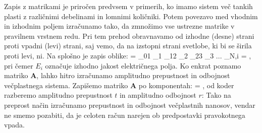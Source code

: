Zapis z matrikami je priročen predvsem v primerih, ko imamo sistem več tankih plasti
z različnimi debelinami in lomnimi količniki. Potem povezavo med vhodnim in izhodnim poljem
izračunamo tako, da zmnožimo vse ustrezne matrike v pravilnem vrstnem redu. Pri tem 
prehod obravnavamo od izhodne (desne) strani proti vpadni (levi) strani, saj vemo, da na
izstopni strani svetlobe, ki bi se širila proti levi, ni. Na splošno je zapis oblike:
\beq
\left[\begin{array}{c}
E_{0}\\
E_{0}'\\
\end{array}\right] = 
_{01}
_1
_{12}
_2
_{23}
_3 ... _{N,i}
\left[\begin{array}{c}
E_i\\
0\\
\end{array}\right] =
\left[\begin{array}{c}
E_i\\
0\\
\end{array}\right]\!\!,
\label{eq:06_63}
\eeq
pri čemer $E_i$ označuje izhodno jakost električnega polja. Ko enkrat 
poznamo matriko $\mathbf{A}$, lahko hitro izračunamo amplitudno 
prepustnost in odbojnost večplastnega sistema. Zapišemo matriko 
$\mathbf{A}$ po komponentah:
\beq
\left[\begin{array}{c}
E_{0}\\
E_{0}'\\
\end{array}\right] =
\left[\begin{array}{cc}
A_{11}& A_{12}\\
A_{21}& A_{22}\\
\end{array}\right]\cdot
\left[\begin{array}{c}
E_i\\
0\\
\end{array}\right]\!\!,
\label{eq:06_64}
\eeq
od koder razberemo amplitudno prepustnost $t$ in amplitudno odbojnost $r$:
Tako na preprost način izračunamo prepustnost in odbojnost
večplastnih nanosov, vendar ne smemo pozabiti, 
da je celoten račun narejen ob predpostavki pravokotnega vpada.

